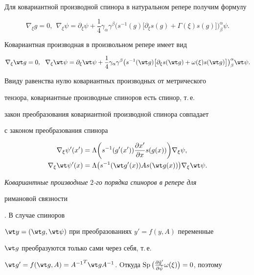 Для ковариантной производной спинора в натуральном репере получим формулу


$$


\nabla_\xi g=0,\ \ \nabla_\xi\psi=\partial_\xi\psi+\frac{1}{4}


\gamma_\alpha\gamma^\beta\big(s^{-1}(g)\big[


\partial_\xi s( g)+\Gamma(\xi)s( g)\big]\big)^\alpha_\beta


\psi.


$$


Ковариантная производная в произвольном репере имеет вид


$$


\nabla_\xi \wt g=0,\ \ \nabla_\xi\wt\psi=\partial_\xi\wt\psi+\frac{1}{4}


\gamma_\alpha\gamma^\beta\big(s^{-1}(\wt g)\big[


\partial_\xi s(\wt g)+\omega(\xi)s(\wt g)\big]\big)^\alpha_\beta\wt\psi.


$$


Ввиду равенства нулю ковариантных производных от метрического


тензора, ковариантные производные спиноров есть спинор, т.\,е.


закон преобразования ковариантной производной спинора совпадает


с законом преобразования спинора


\begin{align*}


\nabla_\xi\psi'(x')&=\Lambda\bigg(s^{-1}(g'(x'))


\frac{\partial x'}{\partial x}s(g(x))\bigg)\nabla_\xi\psi,\\


\nabla_\xi\wt\psi'(x)&=\Lambda\big(s^{-1}(\wt g'(x))


A s(\wt g(x))\big)\nabla_\xi\wt\psi.


\end{align*}





{\it Ковариантные производные $2$-го порядка спиноров в репере для


римановой связности}. В случае спиноров


$\wt y=(\wt g,\wt\psi)$ при преобразованиях $y'=f(y,A)$ переменные


$\wt g$ преобразуются только сами через себя, т.\,е.


$\wt g'=f(\wt g,A)={A^{-1}}^T\wt g A^{-1}$. Oткуда $\SP\big(\frac{\partial


\Tilde g'}{\partial \Tilde \psi} \omega(\xi) \big)=0$, поэтому


